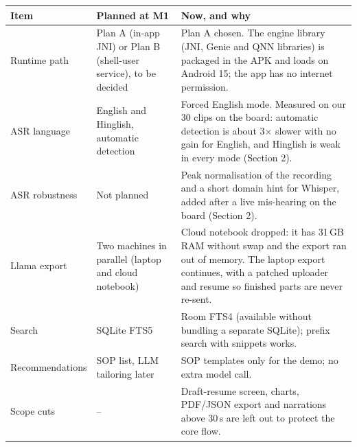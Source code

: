 \documentclass[9pt,a4paper]{extarticle}
\begin{document}
\begin{tabularx}{\linewidth}{@{}p{2.5cm}p{4.3cm}L@{}}
\toprule
\textbf{Item} & \textbf{Planned at M1} & \textbf{Now, and why}\\
\midrule
Runtime path & Plan A (in-app JNI) or Plan B (shell-user service), to be decided & Plan A chosen. The engine library (JNI, Genie and QNN libraries) is packaged in the APK and loads on Android 15; the app has no internet permission.\\
ASR language & English and Hinglish, automatic detection & Forced English mode. Measured on our 30 clips on the board: automatic detection is about 3$\times$ slower with no gain for English, and Hinglish is weak in every mode (Section 2).\\
ASR robustness & Not planned & Peak normalisation of the recording and a short domain hint for Whisper, added after a live mis-hearing on the board (Section 2).\\
Llama export & Two machines in parallel (laptop and cloud notebook) & Cloud notebook dropped: it has 31\,GB RAM without swap and the export ran out of memory. The laptop export continues, with a patched uploader and resume so finished parts are never re-sent.\\
Search & SQLite FTS5 & Room FTS4 (available without bundling a separate SQLite); prefix search with snippets works.\\
Recommendations & SOP list, LLM tailoring later & SOP templates only for the demo; no extra model call.\\
Scope cuts & -- & Draft-resume screen, charts, PDF/JSON export and narrations above 30\,s are left out to protect the core flow.\\
\bottomrule
\end{tabularx}
\end{document}

